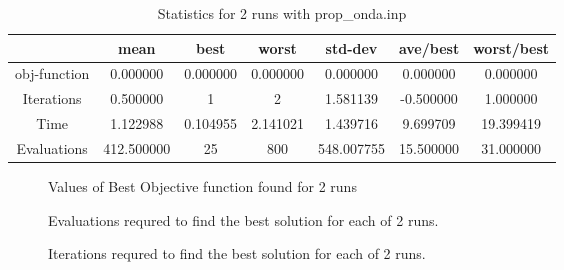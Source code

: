 \documentclass{article}
\begin{document}
\begin{table}[!hp] \label{stats}
  \begin{center}
 \caption{Statistics for 2 runs with prop_onda.inp}
 \begin{tabular}{||c||c||c||c||c||c||c||}
 \hline \hline 
               &           mean&           best&          worst&        std-dev&       ave/best&     worst/best\\ \hline 
   obj-function&       0.000000&       0.000000&       0.000000&       0.000000&       0.000000&       0.000000\\ \hline 
     Iterations&       0.500000&1&2&       1.581139&      -0.500000&       1.000000\\ \hline 
           Time&       1.122988&       0.104955&       2.141021&       1.439716&       9.699709&      19.399419\\ \hline 
    Evaluations&     412.500000&25&800&     548.007755&      15.500000&      31.000000 \\ \hline 



\hline 
 \end{tabular}
 \end{center}
 \end{table}
 \begin{figure}[!htp]
 \centering {} 
 \caption{Values of Best Objective function found for 2 runs} \label{obj-run} \end{figure}
\begin{figure}[!htp]
 \centering {} 
 \caption{Evaluations requred to find the best solution for each of  2 runs.} \label{eval-run}\end{figure}
\begin{figure}[!htp]
 \centering {} 
 \caption{Iterations requred to find the best solution for each of 2 runs.} \label{iter-run} \end{figure}
 
\end{document}
